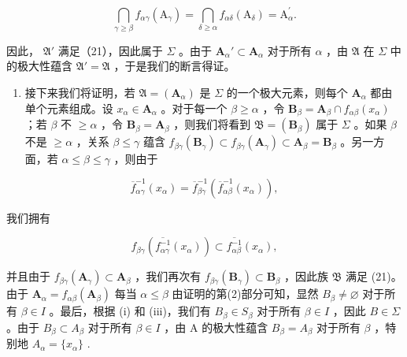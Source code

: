 \[
\bigcap_ {\gamma \geqslant \beta} f _ {\alpha \gamma} (\mathrm{A} _ {\gamma}) = \bigcap_ {\delta \geqslant \alpha} f _ {\alpha \delta} (\mathrm{A} _ {\delta}) = \mathrm{A} _ {\alpha} ^ {\prime}.
\]

因此， \(\mathfrak{A}'\) 满足（21），因此属于 \(\Sigma\) 。由于 \(\mathbf{A}_{\alpha}' \subset \mathbf{A}_{\alpha}\) 对于所有 \(\alpha\) ，由 \(\mathfrak{A}\) 在 \(\Sigma\) 中的极大性蕴含 \(\mathfrak{A}' = \mathfrak{A}\) ，于是我们的断言得证。

\begin{enumerate}
\def\labelenumi{(\arabic{enumi})}
\setcounter{enumi}{2}
\tightlist
\item
  接下来我们将证明，若 \(\mathfrak{A} = (\mathbf{A}_{\alpha})\) 是 \(\Sigma\) 的一个极大元素，则每个 \(\mathbf{A}_{\alpha}\) 都由单个元素组成。设 \(x_{\alpha} \in \mathbf{A}_{\alpha}\) 。对于每一个 \(\beta \geqslant \alpha\) ，令 \(\mathbf{B}_{\beta} = \mathbf{A}_{\beta} \cap f_{\alpha \beta}(x_{\alpha})\) ；若 \(\beta\) 不 \(\geqslant \alpha\) ，令 \(\mathbf{B}_{\beta} = \mathbf{A}_{\beta}\) ，则我们将看到 \(\mathfrak{B} = (\mathbf{B}_{\beta})\) 属于 \(\Sigma\) 。如果 \(\beta\) 不是 \(\geqslant \alpha\) ，关系 \(\beta \leqslant \gamma\) 蕴含 \(f_{\beta \gamma}(\mathbf{B}_{\gamma}) \subset f_{\beta \gamma}(\mathbf{A}_{\gamma}) \subset \mathbf{A}_{\beta} = \mathbf{B}_{\beta}\) 。另一方面，若 \(\alpha \leqslant \beta \leqslant \gamma\) ，则由于
\end{enumerate}

\[
\overline {{f}} _ {\alpha \gamma} ^ {- 1} (x _ {\alpha}) = \overline {{f}} _ {\beta \gamma} ^ {- 1} (\overline {{f}} _ {\alpha \beta} ^ {- 1} (x _ {\alpha})),
\]

我们拥有

\[
f _ {\beta \gamma} (\overline {{f _ {\alpha \gamma} ^ {- 1}}} (x _ {\alpha})) \subset \overline {{f _ {\alpha \beta} ^ {- 1}}} (x _ {\alpha}),
\]

并且由于 \(f_{\beta \gamma}(\mathbf{A}_{\gamma}) \subset \mathbf{A}_{\beta}\) ，我们再次有 \(f_{\beta \gamma}(\mathbf{B}_{\gamma}) \subset \mathbf{B}_{\beta}\) ，因此族 \(\mathfrak{B}\) 满足 (21)。由于 \(\mathbf{A}_{\alpha} = f_{\alpha \beta}(\mathbf{A}_{\beta})\) 每当 \(\alpha \leqslant \beta\) 由证明的第(2)部分可知，显然 \(B_{\beta} \neq \varnothing\) 对于所有 \(\beta \in I\) 。最后，根据 (i) 和 (iii)，我们有 \(B_{\beta} \in S_{\beta}\) 对于所有 \(\beta \in I\) ，因此 \(B \in \Sigma\) 。由于 \(B_{\beta} \subset A_{\beta}\) 对于所有 \(\beta \in I\) ，由 A 的极大性蕴含 \(B_{\beta} = A_{\beta}\) 对于所有 \(\beta\) ，特别地 \(A_{\alpha} = \{x_{\alpha}\}\) .

